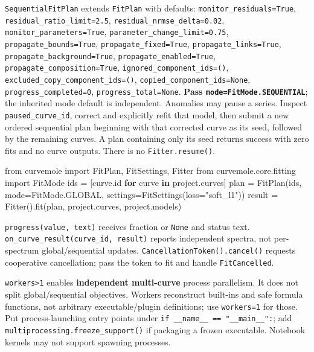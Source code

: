 \documentclass[
  10pt,
  a4paper,
  oneside]{scrreprt}
\newenvironment{Shaded}{}{}
\newcommand{\BuiltInTok}[1]{#1}
\newcommand{\ControlFlowTok}[1]{\textcolor[rgb]{0.00,0.44,0.13}{\textbf{#1}}}
\newcommand{\ImportTok}[1]{#1}
\newcommand{\KeywordTok}[1]{\textcolor[rgb]{0.00,0.44,0.13}{\textbf{#1}}}
\newcommand{\NormalTok}[1]{#1}
\newcommand{\OperatorTok}[1]{\textcolor[rgb]{0.40,0.40,0.40}{#1}}
\newcommand{\StringTok}[1]{\textcolor[rgb]{0.25,0.44,0.63}{#1}}
\begin{document}
\texttt{SequentialFitPlan} extends \texttt{FitPlan} with defaults:
\texttt{monitor\_residuals=True}, \texttt{residual\_ratio\_limit=2.5},
\texttt{residual\_nrmse\_delta=0.02}, \texttt{monitor\_parameters=True},
\texttt{parameter\_change\_limit=0.75}, \texttt{propagate\_bounds=True},
\texttt{propagate\_fixed=True}, \texttt{propagate\_links=True},
\texttt{propagate\_background=True}, \texttt{propagate\_enabled=True},
\texttt{propagate\_composition=True},
\texttt{ignored\_component\_ids=()},
\texttt{excluded\_copy\_component\_ids=()},
\texttt{copied\_component\_ids=None}, \texttt{progress\_completed=0},
\texttt{progress\_total=None}. \textbf{Pass
\texttt{mode=FitMode.SEQUENTIAL}}; the inherited mode default is
independent. Anomalies may pause a series. Inspect
\texttt{paused\_curve\_id}, correct and explicitly refit that model,
then submit a new ordered sequential plan beginning with that corrected
curve as its seed, followed by the remaining curves. A plan containing
only its seed returns success with zero fits and no curve outputs. There
is no \texttt{Fitter.resume()}.

\begin{Shaded}
\begin{Highlighting}[]
\ImportTok{from}\NormalTok{ curvemole }\ImportTok{import}\NormalTok{ FitPlan, FitSettings, Fitter}
\ImportTok{from}\NormalTok{ curvemole.core.fitting }\ImportTok{import}\NormalTok{ FitMode}
\NormalTok{ids }\OperatorTok{=}\NormalTok{ [curve.}\BuiltInTok{id} \ControlFlowTok{for}\NormalTok{ curve }\KeywordTok{in}\NormalTok{ project.curves]}
\NormalTok{plan }\OperatorTok{=}\NormalTok{ FitPlan(ids, mode}\OperatorTok{=}\NormalTok{FitMode.GLOBAL, settings}\OperatorTok{=}\NormalTok{FitSettings(loss}\OperatorTok{=}\StringTok{"soft\_l1"}\NormalTok{))}
\NormalTok{result }\OperatorTok{=}\NormalTok{ Fitter().fit(plan, project.curves, project.models)}
\end{Highlighting}
\end{Shaded}

\texttt{progress(value,\ text)} receives fraction or \texttt{None} and
status text. \texttt{on\_curve\_result(curve\_id,\ result)} reports
independent spectra, not per-spectrum global/sequential updates.
\texttt{CancellationToken().cancel()} requests cooperative cancellation;
pass the token to fit and handle \texttt{FitCancelled}.

\texttt{workers\textgreater{}1} enables \textbf{independent multi-curve}
process parallelism. It does not split global/sequential objectives.
Workers reconstruct built-ins and safe formula functions, not arbitrary
executable/plugin definitions; use \texttt{workers=1} for those. Put
process-launching entry points under
\texttt{if\ \_\_name\_\_\ ==\ "\_\_main\_\_":}; add
\texttt{multiprocessing.freeze\_support()} if packaging a frozen
executable. Notebook kernels may not support spawning processes.
\end{document}
